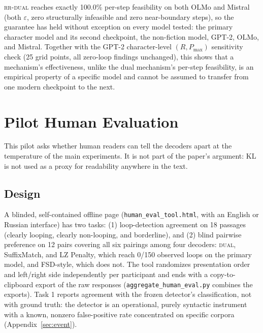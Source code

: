 \documentclass[11pt]{article}
\begin{document}
\textsc{rr-dual} reaches exactly 100.0\% per-step feasibility on both OLMo and Mistral (both $\varepsilon$, zero structurally infeasible and zero near-boundary steps), so the guarantee has held without exception on every model tested: the primary character model and its second checkpoint, the non-fiction model, GPT-2, OLMo, and Mistral. Together with the GPT-2 character-level $(R,P_{\max})$ sensitivity check (25 grid points, all zero-loop findings unchanged), this shows that a mechanism's effectiveness, unlike the dual mechanism's per-step feasibility, is an empirical property of a specific model and cannot be assumed to transfer from one modern checkpoint to the next.


\section{Pilot Human Evaluation}
\label{sec:human-eval}

This pilot asks whether human readers can tell the decoders apart at the temperature of the main experiments. It is not part of the paper's argument: KL is not used as a proxy for readability anywhere in the text.

\subsection{Design}
A blinded, self-contained offline page (\texttt{human\_\allowbreak{}eval\_\allowbreak{}tool.html}, with an English or Russian interface) has two tasks: (1) loop-detection agreement on 18 passages (clearly looping, clearly non-looping, and borderline), and (2) blind pairwise preference on 12 pairs covering all six pairings among four decoders: \textsc{dual}, SuffixMatch, and LZ Penalty, which reach 0/150 observed loops on the primary model, and FSD-style, which does not. The tool randomizes presentation order and left/right side independently per participant and ends with a copy-to-clipboard export of the raw responses (\texttt{aggregate\_\allowbreak{}human\_\allowbreak{}eval.py} combines the exports). Task 1 reports agreement with the frozen detector's classification, not with ground truth: the detector is an operational, purely syntactic instrument with a known, nonzero false-positive rate concentrated on specific corpora (Appendix~\ref{sec:event}).
\end{document}
